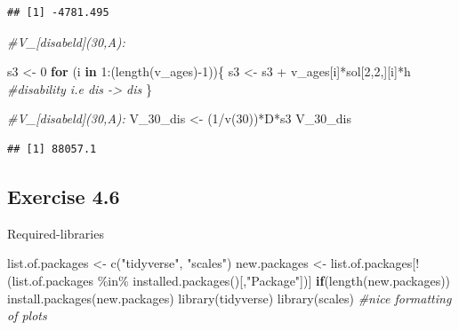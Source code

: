 \documentclass[
]{article}
\newenvironment{Shaded}{\begin{snugshade}}{\end{snugshade}}
\newcommand{\CommentTok}[1]{\textcolor[rgb]{0.56,0.35,0.01}{\textit{#1}}}
\newcommand{\ControlFlowTok}[1]{\textcolor[rgb]{0.13,0.29,0.53}{\textbf{#1}}}
\newcommand{\DecValTok}[1]{\textcolor[rgb]{0.00,0.00,0.81}{#1}}
\newcommand{\FunctionTok}[1]{\textcolor[rgb]{0.00,0.00,0.00}{#1}}
\newcommand{\NormalTok}[1]{#1}
\newcommand{\OtherTok}[1]{\textcolor[rgb]{0.56,0.35,0.01}{#1}}
\newcommand{\SpecialCharTok}[1]{\textcolor[rgb]{0.00,0.00,0.00}{#1}}
\newcommand{\StringTok}[1]{\textcolor[rgb]{0.31,0.60,0.02}{#1}}
\begin{document}
\begin{verbatim}
## [1] -4781.495
\end{verbatim}

\begin{Shaded}
\begin{Highlighting}[]
\CommentTok{\#V\_[disabeld](30,A): }

\NormalTok{s3 }\OtherTok{\textless{}{-}} \DecValTok{0} 
\ControlFlowTok{for}\NormalTok{ (i }\ControlFlowTok{in} \DecValTok{1}\SpecialCharTok{:}\NormalTok{(}\FunctionTok{length}\NormalTok{(v\_ages)}\SpecialCharTok{{-}}\DecValTok{1}\NormalTok{))\{}
\NormalTok{  s3 }\OtherTok{\textless{}{-}}\NormalTok{ s3 }\SpecialCharTok{+}\NormalTok{ v\_ages[i]}\SpecialCharTok{*}\NormalTok{sol[}\DecValTok{2}\NormalTok{,}\DecValTok{2}\NormalTok{,][i]}\SpecialCharTok{*}\NormalTok{h }\CommentTok{\#disability i.e dis {-}\textgreater{} dis}
\NormalTok{\}}


\CommentTok{\#V\_[disabeld](30,A): }
\NormalTok{V\_30\_dis }\OtherTok{\textless{}{-}}\NormalTok{ (}\DecValTok{1}\SpecialCharTok{/}\FunctionTok{v}\NormalTok{(}\DecValTok{30}\NormalTok{))}\SpecialCharTok{*}\NormalTok{D}\SpecialCharTok{*}\NormalTok{s3}
\NormalTok{V\_30\_dis}
\end{Highlighting}
\end{Shaded}

\begin{verbatim}
## [1] 88057.1
\end{verbatim}

\newpage

\hypertarget{exercise-4.6}{%
\subsection{Exercise 4.6}\label{exercise-4.6}}

Required-libraries

\begin{Shaded}
\begin{Highlighting}[]
\NormalTok{list.of.packages }\OtherTok{\textless{}{-}} \FunctionTok{c}\NormalTok{(}\StringTok{"tidyverse"}\NormalTok{, }\StringTok{"scales"}\NormalTok{)}
\NormalTok{new.packages }\OtherTok{\textless{}{-}}\NormalTok{ list.of.packages[}\SpecialCharTok{!}\NormalTok{(list.of.packages }\SpecialCharTok{\%in\%} \FunctionTok{installed.packages}\NormalTok{()[,}\StringTok{"Package"}\NormalTok{])]}
\ControlFlowTok{if}\NormalTok{(}\FunctionTok{length}\NormalTok{(new.packages)) }\FunctionTok{install.packages}\NormalTok{(new.packages)}
\FunctionTok{library}\NormalTok{(tidyverse)}
\FunctionTok{library}\NormalTok{(scales)   }\CommentTok{\#nice formatting of plots}
\end{Highlighting}
\end{Shaded}
\end{document}
